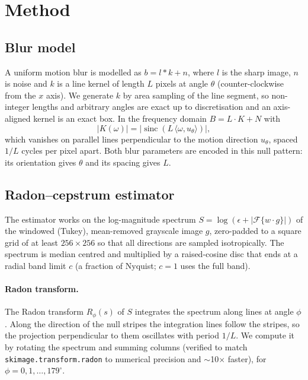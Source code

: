 \section{Method}
\label{sec:method}

\subsection{Blur model}
A uniform motion blur is modelled as $b = l * k + n$, where $l$ is the sharp image, $n$ is
noise and $k$ is a line kernel of length $L$ pixels at angle $\theta$ (counter-clockwise from
the $x$ axis). We generate $k$ by area sampling of the line segment, so non-integer lengths
and arbitrary angles are exact up to discretisation and an axis-aligned kernel is an exact box.
In the frequency domain $B = L\cdot K + N$ with
\begin{equation}
  |K(\omega)| = \left|\operatorname{sinc}\!\left(L\,\langle\omega, u_\theta\rangle\right)\right|,
\end{equation}
which vanishes on parallel lines perpendicular to the motion direction $u_\theta$, spaced
$1/L$ cycles per pixel apart. Both blur parameters are encoded in this null pattern: its
orientation gives $\theta$ and its spacing gives $L$.

\subsection{Radon--cepstrum estimator}
The estimator works on the log-magnitude spectrum $S = \log(\epsilon + |\mathcal{F}\{w\cdot g\}|)$
of the windowed (Tukey), mean-removed grayscale image $g$, zero-padded to a square grid of at
least $256\times256$ so that all directions are sampled isotropically. The spectrum is median
centred and multiplied by a raised-cosine disc that ends at a radial band limit $c$ (a fraction
of Nyquist; $c=1$ uses the full band).

\paragraph{Radon transform.} The Radon transform $R_\phi(s)$ of $S$ integrates the spectrum along
lines at angle $\phi$. Along the direction of the null stripes the integration lines follow the
stripes, so the projection perpendicular to them oscillates with period $1/L$.
We compute it by rotating the spectrum and summing columns (verified to match
\texttt{skimage.transform.radon} to numerical precision and $\sim$10$\times$ faster),
for $\phi = 0,1,\dots,179^\circ$.

